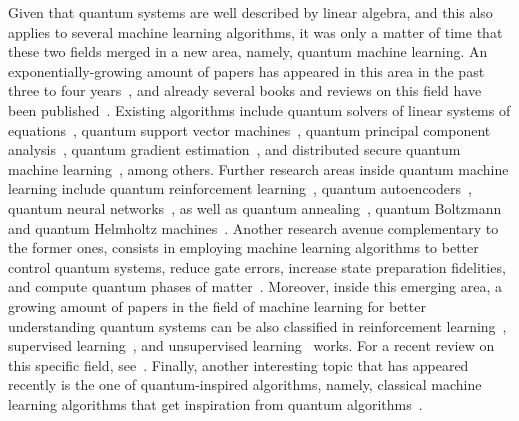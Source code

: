 \documentclass[12pt]{iopart}
\begin{document}
Given that quantum systems are well described by linear algebra, and this also applies to several machine learning algorithms, it was only a matter of time that these two fields merged in a new area, namely, quantum machine learning. An exponentially-growing amount of papers has appeared in this area in the past three to four years~\cite{WOK}, and already several books and reviews on this field have been published~\cite{PeterWittek,Biamonte2017Review,DunjkoReview,SchuldQML,SchuldBook,SchuldQNN,DunjkoWittek}. Existing algorithms include quantum solvers of linear systems of equations~\cite{HHL}, quantum support vector machines~\cite{QSVM}, quantum principal component analysis~\cite{QPCA}, quantum gradient estimation~\cite{QGE}, and distributed secure quantum machine learning~\cite{ShengDSQML}, among others. Further research areas inside quantum machine learning include quantum reinforcement learning~\cite{DongQRL,PaparoPRX,DunjkoPRL,LamataQRL,CardenasQRL,AlbarranQRL,ShangYuQRL,AlbarranMLST}, quantum autoencoders~\cite{AlanAutoencoder,KimAutoencoder,LamataAutoencoder,TischlerAutoencoder,DingAutoencoder,AminAutoencoder}, quantum neural networks~\cite{SchuldQNN,KimAutoencoder,TacchinoQNN,TorronteguiQNN,AlanQNN,MikelQNN1,MikelQNN2,UnaiSupervisedLearning}, as well as quantum annealing~\cite{DWaveNature,VenturelliQA,RieffelQA}, quantum Boltzmann~\cite{AminMelkoQBM,WiebeQBM,PerdomoPRX} and quantum Helmholtz machines~\cite{PerdomoHelmholtz,PerdomoHelmholtz2}. Another research avenue complementary to the former ones, consists in employing machine learning algorithms to better control quantum systems, reduce gate errors, increase state preparation fidelities, and compute quantum phases of matter~\cite{Ghosh1,Ghosh2,SanzGenetic,RuiGenetic,Carrasquilla,MehtaPR,LiuVD,CiracRMP}. Moreover, inside this emerging area, a growing amount of papers in the field of machine learning for better understanding quantum systems can be also classified in reinforcement learning~\cite{MarquardtRL,BukovPRX,Bukov2,MelnikovQL,MelnikovBell,Jelena,PaternostroThermo,MelnikovComm,Lorch,XinWangnpjQuantum,XinWang2,EisertML,LiangJiang}, supervised learning~\cite{PaternostroSupervised,Tomamichel,Milburn,Filippov,MelnikovQUTE,MelnikovNJP,JacobTaylorNPJ,EndresPRL,CarleoNatPhys}, and unsupervised learning~\cite{Cappellaro,Sciarrino} works. For a recent review on this specific field, see~\cite{CarrasquillaReview}. Finally, another interesting topic that has appeared recently is the one of quantum-inspired algorithms, namely, classical machine learning algorithms that get inspiration from quantum algorithms~\cite{Tang,Arrazola}.
\end{document}
